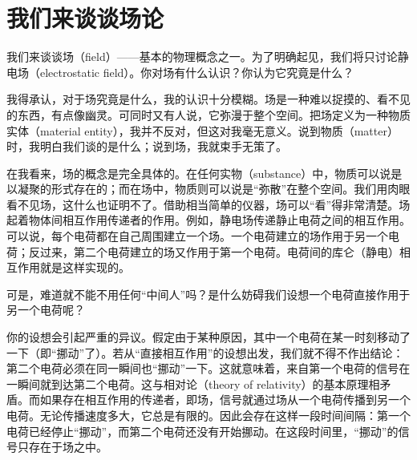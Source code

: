 
\chapter[我们来谈谈场论]{我们来谈谈场论\label{ch-22}}

\begin{dialogue}

\tchr 我们来谈谈场（field）——基本的物理概念之一。为了明确起见，我们将只讨论静电场（electrostatic field）。你对场有什么认识？你认为它究竟是什么？

\stda 我得承认，对于场究竟是什么，我的认识十分模糊。场是一种难以捉摸的、看不见的东西，有点像幽灵。可同时又有人说，它弥漫于整个空间。把场定义为一种物质实体（material entity），我并不反对，但这对我毫无意义。说到物质（matter）时，我明白我们谈的是什么；说到场，我就束手无策了。

\stdb 在我看来，场的概念是完全具体的。在任何实物（substance）中，物质可以说是以凝聚的形式存在的；而在场中，物质则可以说是“弥散”在整个空间。我们用肉眼看不见场，这什么也证明不了。借助相当简单的仪器，场可以“看”得非常清楚。场起着物体间相互作用传递者的作用。例如，静电场传递静止电荷之间的相互作用。可以说，每个电荷都在自己周围建立一个场。一个电荷建立的场作用于另一个电荷；反过来，第二个电荷建立的场又作用于第一个电荷。电荷间的库仑（静电）相互作用就是这样实现的。

\stda 可是，难道就不能不用任何“中间人”吗？是什么妨碍我们设想一个电荷直接作用于另一个电荷呢？

\stdb 你的设想会引起严重的异议。假定由于某种原因，其中一个电荷在某一时刻移动了一下（即“挪动”了）。若从“直接相互作用”的设想出发，我们就不得不作出结论：第二个电荷必须在同一瞬间也“挪动”一下。这就意味着，来自第一个电荷的信号在一瞬间就到达第二个电荷。这与相对论（theory of relativity）的基本原理相矛盾。而如果存在相互作用的传递者，即场，信号就通过场从一个电荷传播到另一个电荷。无论传播速度多大，它总是有限的。因此会存在这样一段时间间隔：第一个电荷已经停止“挪动”，而第二个电荷还没有开始挪动。在这段时间里，“挪动”的信号只存在于场之中。


\end{dialogue}
